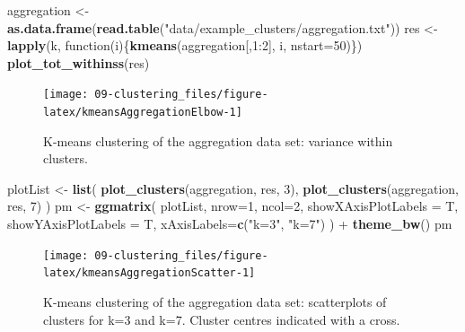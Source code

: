 \documentclass[]{book}
\newenvironment{Shaded}{\begin{snugshade}}{\end{snugshade}}
\newcommand{\KeywordTok}[1]{\textcolor[rgb]{0.13,0.29,0.53}{\textbf{{#1}}}}
\newcommand{\DataTypeTok}[1]{\textcolor[rgb]{0.13,0.29,0.53}{{#1}}}
\newcommand{\DecValTok}[1]{\textcolor[rgb]{0.00,0.00,0.81}{{#1}}}
\newcommand{\StringTok}[1]{\textcolor[rgb]{0.31,0.60,0.02}{{#1}}}
\newcommand{\NormalTok}[1]{{#1}}
\theoremstyle{definition}
\theoremstyle{definition}
\theoremstyle{definition}
\theoremstyle{remark}
\begin{document}
\begin{Shaded}
\begin{Highlighting}[]
\NormalTok{aggregation <-}\StringTok{ }\KeywordTok{as.data.frame}\NormalTok{(}\KeywordTok{read.table}\NormalTok{(}\StringTok{"data/example_clusters/aggregation.txt"}\NormalTok{))}
\NormalTok{res <-}\StringTok{ }\KeywordTok{lapply}\NormalTok{(k, function(i)\{}\KeywordTok{kmeans}\NormalTok{(aggregation[,}\DecValTok{1}\NormalTok{:}\DecValTok{2}\NormalTok{], i, }\DataTypeTok{nstart=}\DecValTok{50}\NormalTok{)\})}
\KeywordTok{plot_tot_withinss}\NormalTok{(res)}
\end{Highlighting}
\end{Shaded}

\begin{figure}

{\centering \texttt{[image: 09-clustering\_files/figure-latex/kmeansAggregationElbow-1]} 

}

\caption{K-means clustering of the aggregation data set: variance within clusters.}\label{fig:kmeansAggregationElbow}
\end{figure}

\begin{Shaded}
\begin{Highlighting}[]
\NormalTok{plotList <-}\StringTok{ }\KeywordTok{list}\NormalTok{(}
  \KeywordTok{plot_clusters}\NormalTok{(aggregation, res, }\DecValTok{3}\NormalTok{),}
  \KeywordTok{plot_clusters}\NormalTok{(aggregation, res, }\DecValTok{7}\NormalTok{)}
\NormalTok{)}
\NormalTok{pm <-}\StringTok{ }\KeywordTok{ggmatrix}\NormalTok{(}
  \NormalTok{plotList, }\DataTypeTok{nrow=}\DecValTok{1}\NormalTok{, }\DataTypeTok{ncol=}\DecValTok{2}\NormalTok{, }\DataTypeTok{showXAxisPlotLabels =} \NormalTok{T, }\DataTypeTok{showYAxisPlotLabels =} \NormalTok{T, }
  \DataTypeTok{xAxisLabels=}\KeywordTok{c}\NormalTok{(}\StringTok{"k=3"}\NormalTok{, }\StringTok{"k=7"}\NormalTok{)}
\NormalTok{) +}\StringTok{ }\KeywordTok{theme_bw}\NormalTok{()}
\NormalTok{pm}
\end{Highlighting}
\end{Shaded}

\begin{figure}

{\centering \texttt{[image: 09-clustering\_files/figure-latex/kmeansAggregationScatter-1]} 

}

\caption{K-means clustering of the aggregation data set: scatterplots of clusters for k=3 and k=7. Cluster centres indicated with a cross.}\label{fig:kmeansAggregationScatter}
\end{figure}
\end{document}
